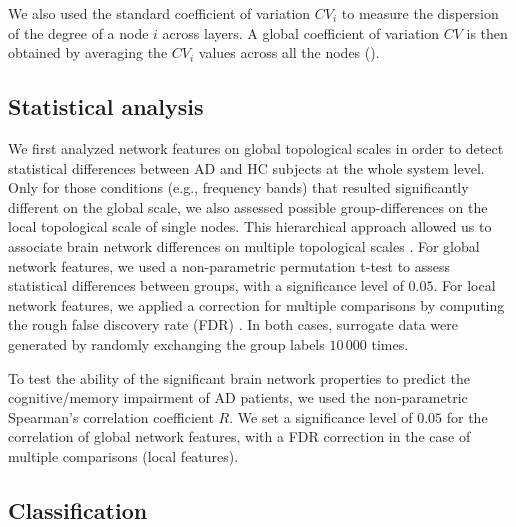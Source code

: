 We also used the standard coefficient of variation $CV_i$ to measure the dispersion of the degree of a node $i$ across layers. A global coefficient of variation $CV$ is then obtained by averaging the $CV_i$ values across all the nodes  ().

\subsection{Statistical analysis}

We first analyzed network features on global topological scales in order to detect statistical differences between AD and HC subjects at the whole system level.
Only for those conditions (e.g., frequency bands) that resulted significantly different on the global scale, we also assessed possible group-differences on the local topological scale of single nodes.
This hierarchical approach allowed us to associate brain network differences on multiple topological scales \citep{de_vico_fallani_interhemispheric_2016}.
For global network features, we used a non-parametric permutation t-test to assess statistical differences between groups, with a significance level of $0.05$. For local network features, we applied a correction for multiple comparisons by computing the rough false discovery rate (FDR) \citep{benjamini_controlling_1995,zar_biostatistical_1999}.
In both cases, surrogate data were generated by randomly exchanging the group labels $10\,000$ times.

To test the ability of the significant brain network properties to predict the cognitive/memory impairment of AD patients, we used the non-parametric Spearman's correlation coefficient $R$. We set a significance level of $0.05$ for the correlation of global network features, with a FDR correction in the case of multiple comparisons (local features).


\subsection{Classification}

